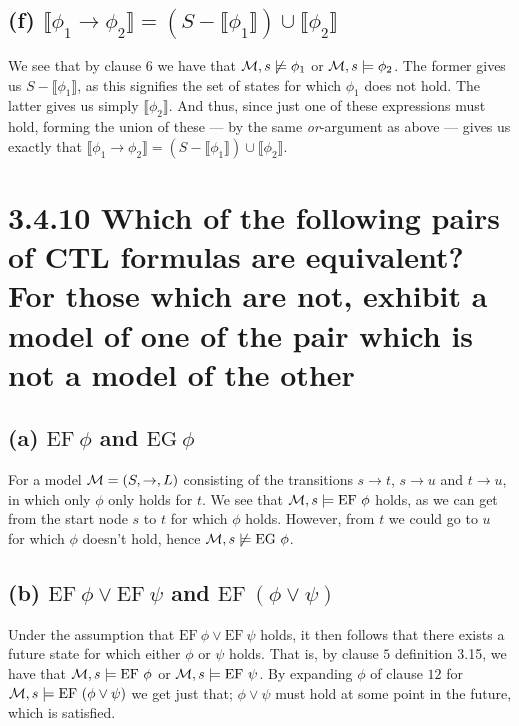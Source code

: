 \documentclass[11pt,a4paper]{article}
\let\imp\to
\begin{document}
\subsection*{(f) \mdseries $\llbracket\phi_1 \imp \phi_2\rrbracket =
(S - \llbracket\phi_1\rrbracket)\cup\llbracket\phi_2\rrbracket$}
We see that by clause $6$ we have that ${\cal M}, s \not\models \phi_1$ or
${\cal M}, s \models \phi_2$. The former gives us $S -
\llbracket\phi_1\rrbracket$, as this signifies the set of states for which
$\phi_1$ does not hold. The latter gives us simply $\llbracket\phi_2
\rrbracket$. And thus, since just one of these expressions must hold, forming
the union of these --- by the same {\it or}-argument as above --- gives us
exactly that $\llbracket\phi_1 \imp \phi_2\rrbracket =
(S - \llbracket\phi_1\rrbracket)\cup\llbracket\phi_2\rrbracket$.

\newpage
\section*{3.4.10 \mdseries Which of the following pairs of CTL formulas are
equivalent? For those which are not, exhibit a model of one of the pair which
is not a model of the other}

\subsection*{(a) \mdseries $\text{EF}{\ }\phi$ and $\text{EG}{\ }\phi$}
For a model ${\cal M} = (S,\imp,L)$ consisting of the transitions $s \imp t$,
$s \imp u$ and $t \imp u$, in which only $\phi$ only holds for $t$. We see
that ${\cal M}, s \models \text{EF}{\ }\phi$ holds, as we can get from the
start node $s$ to $t$ for which $\phi$ holds. However, from $t$ we could go
to $u$ for which $\phi$ doesn't hold, hence
${\cal M}, s \not\models \text{EG}{\ }\phi$.

\subsection*{(b) \mdseries $\text{EF}{\ }\phi \lor \text{EF}{\ }\psi$ and
$\text{EF}{\ }(\phi \lor \psi)$}
Under the assumption that $\text{EF}{\ }\phi \lor \text{EF}{\ }\psi$ holds, it
then follows that there exists a future state for which either $\phi$ or
$\psi$ holds. That is, by clause $5$ definition 3.15, we have that
${\cal M}, s \models \text{EF}{\ }\phi$ or
${\cal M}, s \models \text{EF}{\ }\psi$. By expanding $\phi$ of clause $12$
for ${\cal M}, s \models \text{EF}{\ }(\phi \lor \psi)$ we get just that;
$\phi \lor \psi$ must hold at some point in the future, which is satisfied.
\end{document}
